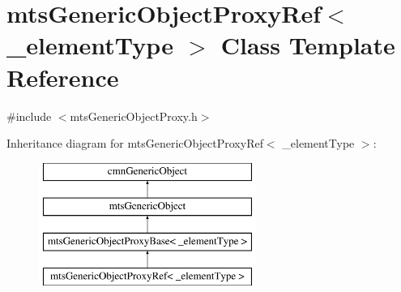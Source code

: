 \hypertarget{classmts_generic_object_proxy_ref}{\section{mts\-Generic\-Object\-Proxy\-Ref$<$ \-\_\-element\-Type $>$ Class Template Reference}
\label{classmts_generic_object_proxy_ref}
}


{\ttfamily \#include $<$mts\-Generic\-Object\-Proxy.\-h$>$}

Inheritance diagram for mts\-Generic\-Object\-Proxy\-Ref$<$ \-\_\-element\-Type $>$\-:\begin{figure}[H]
\begin{center}
\leavevmode
\includegraphics[height=4.000000cm]{dc/d4f/classmts_generic_object_proxy_ref}
\end{center}
\end{figure}
